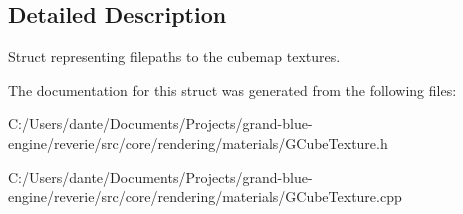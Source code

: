 \subsection{Detailed Description}
Struct representing filepaths to the cubemap textures. 

The documentation for this struct was generated from the following files\+:\begin{DoxyCompactItemize}
\item 
C\+:/\+Users/dante/\+Documents/\+Projects/grand-\/blue-\/engine/reverie/src/core/rendering/materials/G\+Cube\+Texture.\+h\item 
C\+:/\+Users/dante/\+Documents/\+Projects/grand-\/blue-\/engine/reverie/src/core/rendering/materials/G\+Cube\+Texture.\+cpp\end{DoxyCompactItemize}
